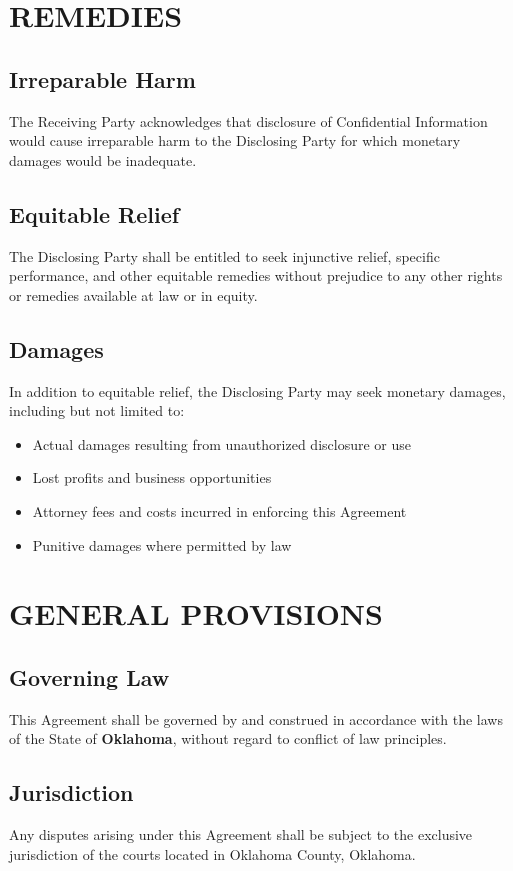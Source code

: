 \documentclass[11pt,letterpaper]{article}
\begin{document}
\section{REMEDIES}

\subsection{Irreparable Harm}
The Receiving Party acknowledges that disclosure of Confidential Information would cause irreparable harm to the Disclosing Party for which monetary damages would be inadequate.

\subsection{Equitable Relief}
The Disclosing Party shall be entitled to seek injunctive relief, specific performance, and other equitable remedies without prejudice to any other rights or remedies available at law or in equity.

\subsection{Damages}
In addition to equitable relief, the Disclosing Party may seek monetary damages, including but not limited to:
\begin{itemize}[leftmargin=0.5cm]
    \item Actual damages resulting from unauthorized disclosure or use
    \item Lost profits and business opportunities
    \item Attorney fees and costs incurred in enforcing this Agreement
    \item Punitive damages where permitted by law
\end{itemize}

\section{GENERAL PROVISIONS}

\subsection{Governing Law}
This Agreement shall be governed by and construed in accordance with the laws of the State of \textbf{Oklahoma}, without regard to conflict of law principles.

\subsection{Jurisdiction}
Any disputes arising under this Agreement shall be subject to the exclusive jurisdiction of the courts located in Oklahoma County, Oklahoma.
\end{document}
